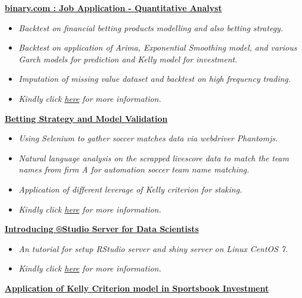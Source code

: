 \documentclass[]{article}
\providecommand{\tightlist}{%
  \setlength{\itemsep}{0pt}\setlength{\parskip}{0pt}}
\begin{document}
\href{https://github.com/englianhu/binary.com-interview-question}{\textbf{binary.com
: Job Application - Quantitative Analyst}}

\begin{itemize}
\tightlist
\item
  \emph{Backtest on financial betting products modelling and also
  betting strategy.}
\item
  \emph{Backtest on application of Arima, Exponential Smoothing model,
  and various Garch models for prediction and Kelly model for
  investment.}
\item
  \emph{Imputation of missing value dataset and backtest on high
  frequency trading.}
\item
  \emph{Kindly click
  \href{https://github.com/englianhu/binary.com-interview-question}{here}
  for more information.}
\end{itemize}

\href{https://github.com/Scibrokes/Betting-Strategy-and-Model-Validation}{\textbf{Betting
Strategy and Model Validation}}

\begin{itemize}
\tightlist
\item
  \emph{Using Selenium to gather soccer matches data via webdriver
  Phantomjs.}
\item
  \emph{Natural language analysis on the scrapped livescore data to
  match the team names from firm A for automation soccer team name
  matching.}
\item
  \emph{Application of different leverage of Kelly criterion for
  staking.}
\item
  \emph{Kindly click
  \href{https://github.com/Scibrokes/Betting-Strategy-and-Model-Validation}{here}
  for more information.}
\end{itemize}

\href{https://github.com/Scibrokes/setup-rstudio-server}{\textbf{Introducing
®Studio Server for Data Scientists}}

\begin{itemize}
\tightlist
\item
  \emph{An tutorial for setup RStudio server and shiny server on Linux
  CentOS 7.}
\item
  \emph{Kindly click
  \href{https://github.com/Scibrokes/setup-rstudio-server}{here} for
  more information.}
\end{itemize}

\href{https://github.com/Scibrokes/kelly-criterion}{\textbf{Application
of Kelly Criterion model in Sportsbook Investment}}
\end{document}
